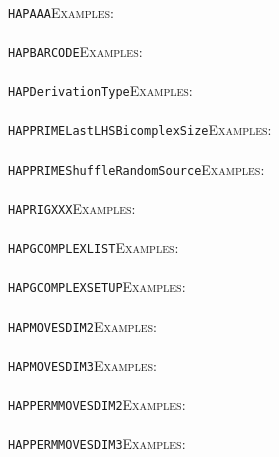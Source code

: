 \documentclass[a4paper,11pt]{report}
\begin{document}
{{ \\
 \texttt{HAPAAA}{\nobreakspace}{\nobreakspace}{\nobreakspace}{\nobreakspace}\textsc{Examples:} \\
 \\
 \texttt{HAPBARCODE}{\nobreakspace}{\nobreakspace}{\nobreakspace}{\nobreakspace}\textsc{Examples:} \\
 \\
 \texttt{HAPDerivationType}{\nobreakspace}{\nobreakspace}{\nobreakspace}{\nobreakspace}\textsc{Examples:} \\
 \\
 \texttt{HAPPRIME{\textunderscore}LastLHSBicomplexSize}{\nobreakspace}{\nobreakspace}{\nobreakspace}{\nobreakspace}\textsc{Examples:} \\
 \\
 \texttt{HAPPRIME{\textunderscore}ShuffleRandomSource}{\nobreakspace}{\nobreakspace}{\nobreakspace}{\nobreakspace}\textsc{Examples:} \\
 \\
 \texttt{HAPRIGXXX}{\nobreakspace}{\nobreakspace}{\nobreakspace}{\nobreakspace}\textsc{Examples:} \\
 \\
 \texttt{HAP{\textunderscore}GCOMPLEX{\textunderscore}LIST}{\nobreakspace}{\nobreakspace}{\nobreakspace}{\nobreakspace}\textsc{Examples:} \\
 \\
 \texttt{HAP{\textunderscore}GCOMPLEX{\textunderscore}SETUP}{\nobreakspace}{\nobreakspace}{\nobreakspace}{\nobreakspace}\textsc{Examples:} \\
 \\
 \texttt{HAP{\textunderscore}MOVES{\textunderscore}DIM{\textunderscore}2}{\nobreakspace}{\nobreakspace}{\nobreakspace}{\nobreakspace}\textsc{Examples:} \\
 \\
 \texttt{HAP{\textunderscore}MOVES{\textunderscore}DIM{\textunderscore}3}{\nobreakspace}{\nobreakspace}{\nobreakspace}{\nobreakspace}\textsc{Examples:} \\
 \\
 \texttt{HAP{\textunderscore}PERMMOVES{\textunderscore}DIM{\textunderscore}2}{\nobreakspace}{\nobreakspace}{\nobreakspace}{\nobreakspace}\textsc{Examples:} \\
 \\
 \texttt{HAP{\textunderscore}PERMMOVES{\textunderscore}DIM{\textunderscore}3}{\nobreakspace}{\nobreakspace}{\nobreakspace}{\nobreakspace}\textsc{Examples:} \\
}}
\end{document}
